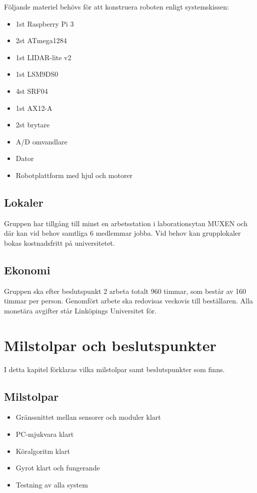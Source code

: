 \documentclass[a4paper,11pt]{article}
\begin{document}
Följande materiel behövs för att konstruera roboten enligt systemskissen:
\begin{itemize}
	\item 1st Raspberry Pi 3
	\item 2st ATmega1284
	\item 1st LIDAR-lite v2
	\item 1st LSM9DS0
	\item 4st SRF04
	\item 1st AX12-A
	\item 2st brytare
	\item A/D omvandlare
	\item Dator
	\item Robotplattform med hjul och motorer
\end{itemize}

\subsection{Lokaler}
Gruppen har tillgång till minst en arbetsstation i laborationsytan MUXEN och där kan vid behov samtliga 6 medlemmar jobba. Vid behov kan grupplokaler bokas kostnadsfritt på universitetet.

\subsection{Ekonomi}
Gruppen ska efter beslutspunkt 2 arbeta totalt 960 timmar, som består av 160 timmar per person. Genomfört arbete ska redovisas veckovis till beställaren. Alla monetära avgifter står Linköpings Universitet för.

\section{Milstolpar och beslutspunkter}
I detta kapitel förklaras vilka milstolpar samt beslutspunkter som finns.

\subsection{Milstolpar}
\begin{itemize}
	\item Gränssnittet mellan sensorer och moduler klart
	\item PC-mjukvara klart
	\item Köralgoritm klart
	\item Gyrot klart och fungerande
	\item Testning av alla system
\end{itemize}
\end{document}
